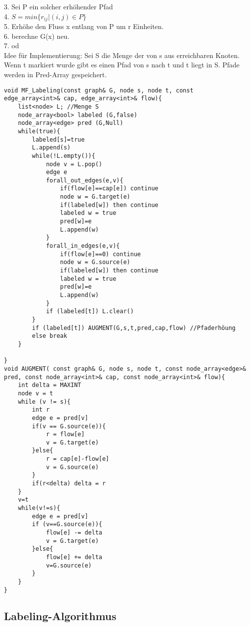 \documentclass[a4paper]{article}
\begin{document}
3.   Sei P ein solcher erhöhender Pfad\\
4.   $S=min\{r_{ij}| (i,j)\in P\}$\\
5.   Erhöhe den Fluss x entlang von P um r Einheiten.\\
6.   berechne G(x) neu.\\
7. od\\
Idee für Implementierung: Sei S die Menge der von s aus erreichbaren Knoten. Wenn t markiert wurde gibt es einen Pfad von s nach t und t liegt in S. Pfade werden in Pred-Array gespeichert.
\begin{lstlisting}
void MF_Labeling(const graph& G, node s, node t, const edge_array<int>& cap, edge_array<int>& flow){
	list<node> L; //Menge S
	node_array<bool> labeled (G,false)
	node_array<edge> pred (G,Null)
	while(true){
		labeled[s]=true
		L.append(s)
		while(!L.empty()){
			node v = L.pop()
			edge e
			forall_out_edges(e,v){
				if(flow[e]==cap[e]) continue
				node w = G.target(e)
				if(labeled[w]) then continue
				labeled w = true
				pred[w]=e
				L.append(w)
			}
			forall_in_edges(e,v){
				if(flow[e]==0) continue
				node w = G.source(e)
				if(labeled[w]) then continue
				labeled w = true
				pred[w]=e
				L.append(w)
			}
			if (labeled[t]) L.clear()
		}
		if (labeled[t]) AUGMENT(G,s,t,pred,cap,flow) //Pfaderhöung
		else break
	}

}
void AUGMENT( const graph& G, node s, node t, const node_array<edge>& pred, const node_array<int>& cap, const node_array<int>& flow){
	int delta = MAXINT
	node v = t
	while (v != s){
		int r
		edge e = pred[v]
		if(v == G.source(e)){
			r = flow[e]
			v = G.target(e)		
		}else{
			r = cap[e]-flow[e]
			v = G.source(e)
		}
		if(r<delta) delta = r
	}
	v=t
	while(v!=s){
		edge e = pred[v]
		if (v==G.source(e)){
			flow[e] -= delta
			v = G.target(e)
		}else{
			flow[e] += delta
			v=G.source(e)
		}
	}
}
\end{lstlisting}

\subsection{Labeling-Algorithmus}
\end{document}
